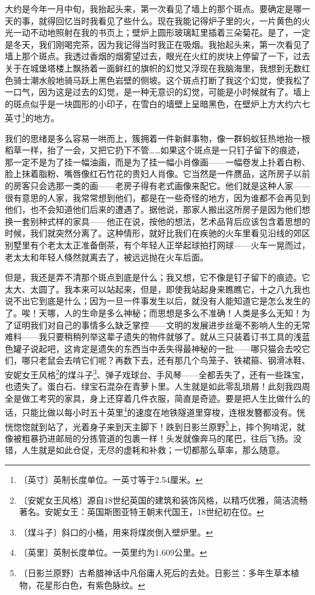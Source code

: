 \documentclass[12pt,UTF-8,openany]{ctexbook}
\begin{document}
\begin{normalsize}
    
    大约是今年一月中旬，我抬起头来，第一次看见了墙上的那个斑点。要确定是哪一天的事，就得回忆当时我看见了些什么。现在我能记得炉子里的火，一片黄色的火光一动不动地照射在我的书页上；壁炉上圆形玻璃缸里插着三朵菊花。是了，一定是冬天，我们刚喝完茶，因为我记得当时我正在吸烟。我抬起头来，第一次看见了墙上那个斑点。我透过香烟的烟雾望过去，眼光在火红的炭块上停留了一下，过去关于在城堡塔楼上飘扬着一面鲜红的旗帜的幻觉又浮现在我脑海里，我想到无数红色骑士潮水般地骑马跃上黑色岩壁的侧坡。这个斑点打断了我这个幻觉，使我松了一口气，因为这是过去的幻觉，是一种无意识的幻觉，可能是小时候就有了。墙上的斑点似乎是一块圆形的小印子，在雪白的墙壁上呈暗黑色，在壁炉上方大约六七英寸\footnote{〔英寸〕英制长度单位。一英寸等于2.54厘米。}的地方。
    
    我们的思绪是多么容易一哄而上，簇拥着一件新鲜事物，像一群蚂蚁狂热地抬一根稻草一样，抬了一会，又把它扔下不管……如果这个斑点是一只钉子留下的痕迹，那一定不是为了挂一幅油画，而是为了挂一幅小肖像画——一幅卷发上扑着白粉、脸上抹着脂粉、嘴唇像红石竹花的贵妇人肖像。它当然是一件赝品，这所房子以前的房客只会选那一类的画——老房子得有老式画像来配它。他们就是这种人家——很有意思的人家，我常常想到他们，都是在一些奇怪的地方，因为谁都不会再见到他们，也不会知道他们后来的遭遇了。据他说，那家人搬出这所房子是因为他们想换一套别种式样的家具——他正在说，按他的想法，艺术品背后应该包含着思想的时候，我们就突然分离了。这种情形，就好比我们在疾驰的火车里看见沿线的郊区别墅里有个老太太正准备倒茶，有个年轻人正举起球拍打网球——火车一晃而过，老太太和年轻人倏然就离去了，被远远抛在火车后面。
    
    但是，我还是弄不清那个斑点到底是什么；我又想，它不像是钉子留下的痕迹。它太大、太圆了。我本来可以站起来，但是，即使我站起身来瞧瞧它，十之八九我也说不出它到底是什么；因为一旦一件事发生以后，就没有人能知道它是怎么发生的了。唉！天哪，人的生命是多么神秘；而思想是多么不准确！人类是多么无知！为了证明我们对自己的事情多么缺乏掌控——文明的发展进步丝毫不影响人生的无常难料——我只要稍稍列举这辈子遗失的物件就够了。就从三只装着订书工具的浅蓝色罐子说起吧，这肯定是遗失的东西当中丢失得最神秘的一批——哪只猫会去咬它们，哪只老鼠会去啃它们呢？再数下去，还有那几个鸟笼子、铁裙箍、钢滑冰鞋、安妮女王风格\footnote{〔安妮女王风格〕源自18世纪英国的建筑和装饰风格，以精巧优雅，简洁流畅著名。安妮女王：英国斯图亚特王朝末代国王，18世纪初在位。}的煤斗子\footnote{〔煤斗子〕斜口的小桶，用来将煤炭倒入壁炉里。}、弹子戏球台、手风琴——全都丢失了，还有一些珠宝，也遗失了。蛋白石、绿宝石混杂在青萝卜里。人生就是如此零乱琐屑！此刻我四周全是做工考究的家具，身上还穿着几件衣服，简直是奇迹。要是把人生比做什么的话，只能比做以每小时五十英里\footnote{〔英里〕英制长度单位。一英里约为1.609公里。}的速度在地铁隧道里穿梭，连根发簪都没有。恍恍惚惚就到站了，光着身子来到天主脚下！跌到日影兰原野\footnote{〔日影兰原野〕古希腊神话中凡俗庸人死后的去处。日影兰：多年生草本植物，花星形白色，有紫色脉纹。}上，摔个狗啃泥，就像被粗暴扔进邮局的分拣管道的包裹一样！头发就像奔马的尾巴，往后飞扬。没错，人生就是如此仓促，无尽的虚耗和补救；一切都那么草率，那么随意。
    

\end{normalsize}
\end{document}
